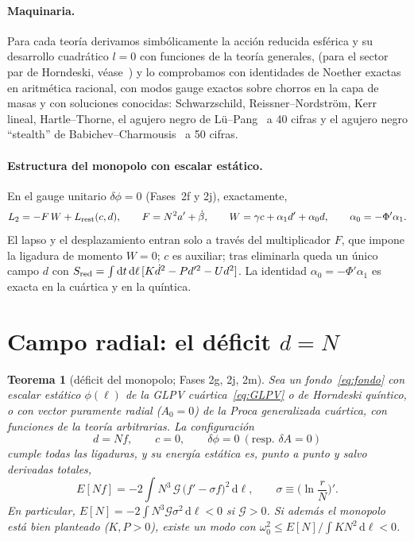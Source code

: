 \documentclass[11pt,a4paper]{article}
\newtheorem{teorema}{Teorema}
\theoremstyle{remark}
\newcommand{\G}{\mathcal G}
\newcommand{\dd}{\mathrm d}
\begin{document}
\paragraph{Maquinaria.} Para cada teoría derivamos simbólicamente la acción reducida esférica y su desarrollo cuadrático $l=0$ con funciones de la teoría generales, (para el sector par de Horndeski, véase~\cite{KMS2}) y lo comprobamos con identidades de Noether exactas en aritmética racional, con modos gauge exactos sobre chorros en la capa de masas y con soluciones conocidas: Schwarzschild, Reissner--Nordström, Kerr lineal, Hartle--Thorne, el agujero negro de Lü--Pang~\cite{LuPang} a 40 cifras y el agujero negro ``stealth'' de Babichev--Charmousis~\cite{BabichevCharmousis} a 50 cifras.

\paragraph{Estructura del monopolo con escalar estático.} En el gauge unitario $\delta\phi=0$ (Fases~2f y 2j), exactamente,
\begin{equation}
L_2=-F\,W+L_{\rm rest}(c,d),\qquad F=N^2a'+\dot\beta,\qquad W=\gamma c+\alpha_1d'+\alpha_0d,\qquad \alpha_0=-\Phi'\alpha_1 .
\label{eq:estructura}
\end{equation}
El lapso y el desplazamiento entran solo a través del multiplicador $F$, que impone la ligadura de momento $W=0$; $c$ es auxiliar; tras eliminarla queda un único campo $d$ con $S_{\rm red}=\int\dd t\,\dd\ell\,[K\dot d^2-Pd'^2-Ud^2]$. La identidad $\alpha_0=-\Phi'\alpha_1$ es exacta en la cuártica y en la quíntica.

\section{Campo radial: el déficit $d=N$}\label{sec:radial}

\begin{teorema}[déficit del monopolo; Fases 2g, 2j, 2m]\label{teo:dN}
Sea un fondo~\eqref{eq:fondo} con escalar estático $\phi(\ell)$ de la GLPV cuártica~\eqref{eq:GLPV} o de Horndeski quíntico, o con vector puramente radial ($A_0=0$) de la Proca generalizada cuártica, con funciones de la teoría arbitrarias. La configuración
\begin{equation}
d=N f,\qquad c=0,\qquad \delta\phi=0\ (\text{resp. }\delta A=0)
\end{equation}
cumple todas las ligaduras, y su energía estática es, punto a punto y salvo derivadas totales,
\begin{equation}
E[Nf]=-2\int N^3\,\G\,\big(f'-\sigma f\big)^2\,\dd\ell,\qquad \sigma\equiv\Big(\ln\frac rN\Big)' .
\label{eq:EN}
\end{equation}
En particular, $E[N]=-2\int N^3\G\sigma^2\,\dd\ell<0$ si $\G>0$. Si además el monopolo está bien planteado ($K,P>0$), existe un modo con $\omega_0^2\le E[N]/\int KN^2\,\dd\ell<0$.
\end{teorema}
\end{document}
